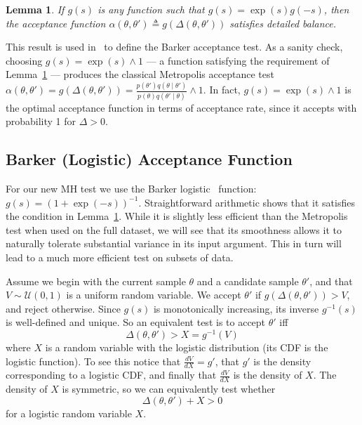 \documentclass[twoside]{article} \usepackage{aistats2017}
\newtheorem{lemma}{Lemma}
\begin{document}
\begin{lemma}\label{lem:detailed_balance}
    If $g(s)$ is any function such that $g(s) = \exp(s) g(-s)$, then the
    acceptance function $\alpha(\theta,\theta') \triangleq
    g(\Delta(\theta,\theta'))$ satisfies detailed balance.
\end{lemma}

This result is used in~\citet{Barker65} to define the Barker acceptance test.  As
a sanity check, choosing $g(s) = \exp(s) \wedge 1$ --- a function satisfying the
requirement of Lemma~\ref{lem:detailed_balance} --- produces the classical
Metropolis acceptance test $\alpha(\theta,\theta') = g(\Delta(\theta,\theta')) =
\frac{p(\theta')q(\theta \mid \theta')}{p(\theta)q(\theta' \mid \theta)}\wedge
1$. In fact, $g(s) =\exp(s) \wedge 1$ is the optimal acceptance function in
terms of acceptance rate, since it accepts with probability 1 for $\Delta > 0$.

\subsection{Barker (Logistic) Acceptance Function}\label{ssec:barker_function}
For our new MH test we use the Barker logistic~\citep{Barker65} function:
$g(s)=(1+\exp(-s))^{-1}$. Straightforward arithmetic shows that it satisfies the
condition in Lemma~\ref{lem:detailed_balance}.  While it is slightly less
efficient than the Metropolis test when used on the full dataset, we will see
that its smoothness allows it to naturally tolerate substantial variance in its
input argument. This in turn will lead to a much more efficient test on subsets
of data.

Assume we begin with the current sample $\theta$ and a candidate sample
$\theta'$, and that $V \sim \mathcal{U}(0,1)$ is a uniform random variable. We
accept $\theta'$ if $g(\Delta(\theta,\theta')) > V$, and reject otherwise.
Since $g(s)$ is monotonically increasing, its inverse $g^{-1}(s)$ is
well-defined and unique. So an equivalent test is to accept $\theta'$ iff
\begin{equation}\label{eq:equivalent_test}
    \Delta(\theta,\theta') > X = g^{-1}(V)
\end{equation}
where $X$ is a random variable with the logistic distribution (its CDF is the
logistic function). To see this notice that $\frac{dV}{dX} = g'$, that $g'$ is
the density corresponding to a logistic CDF, and finally that $\frac{dV}{dX}$ is
the density of $X$. The density of $X$ is symmetric, so we can equivalently test
whether
\begin{equation}\label{eq:the_exact_test}
    \Delta(\theta,\theta') + X > 0
\end{equation}
for a logistic random variable $X$.
\end{document}

